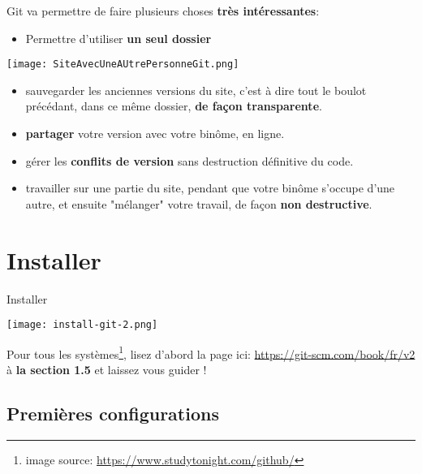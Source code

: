 \documentclass[10pt]{beamer}
\begin{document}
\begin{frame}
Git va permettre de faire plusieurs choses \textbf{très intéressantes}:
\begin{itemize}
\item Permettre d'utiliser \textbf{un seul dossier}
\end{itemize}
\texttt{[image: SiteAvecUneAUtrePersonneGit.png]}

\begin{itemize}
\item sauvegarder les anciennes versions du site, c'est à dire tout le boulot précédant, dans ce même dossier, \textbf{de façon transparente}.
\item \textbf{partager} votre version avec votre binôme, en ligne.
\item gérer les \textbf{conflits de version} sans destruction définitive du code.
\item travailler sur une partie du site, pendant que votre binôme s'occupe d'une autre, et ensuite "mélanger" votre travail, de façon \textbf{non destructive}.

\end{itemize}

\end{frame}




\section{Installer}

\begin{frame}{Installer}

\texttt{[image: install-git-2.png]}


Pour tous les systèmes\footnote{image source: \url{https://www.studytonight.com/github/}}, lisez d'abord la page ici:
\url{https://git-scm.com/book/fr/v2} à \textbf{la section 1.5} et laissez vous guider !
\end{frame}




\subsection{Premières configurations  }
\end{document}
